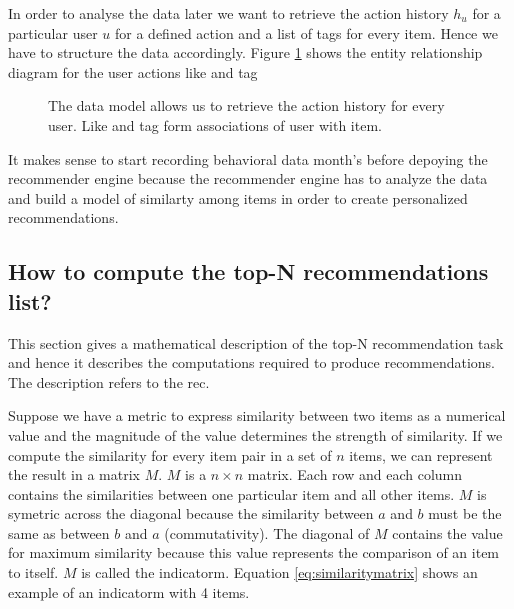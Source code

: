 In order to analyse the data later we want to retrieve the action history $h_u$ for a particular user $u$ for a defined action and a list of tags for every item. Hence we have to structure the data accordingly. Figure \ref{fig:er} shows the entity relationship diagram for the user actions \gls{like} and \gls{tag}


\begin{figure}
\centering
{}
\caption{The data model allows us to retrieve the action history for every user. Like and tag form associations of user with item.}
\label{fig:er}
\end{figure}

It makes sense to start recording behavioral data month's before depoying the recommender engine because the recommender engine has to analyze the data and build a model of similarty among items in order to create personalized recommendations.

\subsection{How to compute the top-N recommendations list?}
\label{sec:problem}
This section gives a mathematical description of the top-N recommendation task and hence it describes the computations required to produce recommendations. The description refers to the \gls{rec}.

Suppose we have a metric to express similarity between two items as a numerical value and the magnitude of the value determines the strength of similarity. If we compute the similarity for every item pair in a set of $n$ items, we can represent the result in a matrix $M$. $M$ is a $n \times n$ matrix. Each row and each column contains the similarities between one particular item and all other items. $M$ is symetric across the diagonal because the similarity between $a$ and $b$ must be the same as between $b$ and $a$ (commutativity). The diagonal of $M$ contains the value for maximum similarity because this value represents the comparison of an item to itself. $M$ is called the \gls{indicatorm}. Equation \ref{eq:similaritymatrix} shows an example of an \gls{indicatorm} with 4 items.

